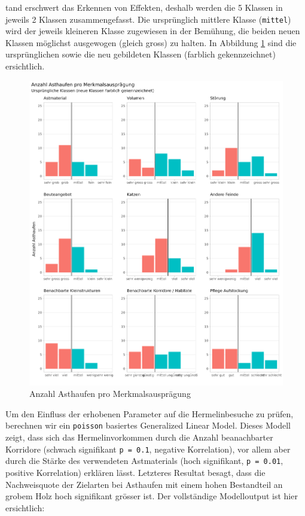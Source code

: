\documentclass[
  oneside]{scrbook}
\begin{document}
tand erschwert das Erkennen von Effekten, deshalb werden die 5 Klassen in jeweils 2 Klassen zusammengefasst. Die ursprünglich mittlere Klasse (\texttt{mittel}) wird der jeweils kleineren Klasse zugewiesen in der Bemühung, die beiden neuen Klassen möglichst ausgewogen (gleich gross) zu halten. In Abbildung \ref{fig:asthaufenqualcount} sind die ursprünglichen sowie die neu gebildeten Klassen (farblich gekennzeichnet) ersichtlich.

\begin{figure}
\includegraphics[width=41in]{images/asthaufen_qualitaet_histogramm} \caption{Anzahl Asthaufen pro Merkmalsausprägung}\label{fig:asthaufenqualcount}
\end{figure}

Um den Einfluss der erhobenen Parameter auf die Hermelinbesuche zu prüfen, berechnen wir ein \texttt{poisson} basiertes Generalized Linear Model. Dieses Modell zeigt, dass sich das Hermelinvorkommen durch die Anzahl beanachbarter Korridore (schwach signifikant \texttt{p\ =\ 0.1}, negative Korrelation), vor allem aber durch die Stärke des verwendeten Astmaterials (hoch signifikant, \texttt{p\ =\ 0.01}, positive Korrelation) erklären lässt. Letzteres Resultat besagt, dass die Nachweisquote der Zielarten bei Asthaufen mit einem hohen Bestandteil an grobem Holz hoch signifikant grösser ist.
Der vollständige Modelloutput ist hier ersichtlich:
\end{document}
